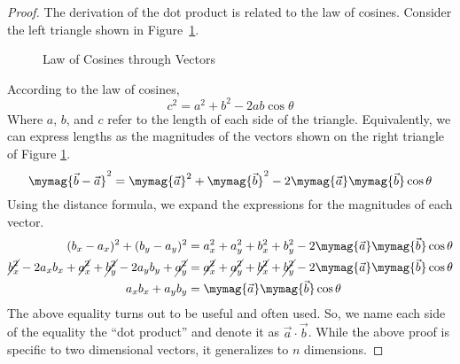 \documentclass[11pt]{article}
\newtheorem{proof}{Proof}
\begin{document}
\begin{proof}
    The derivation of the dot product is related to the law of cosines. Consider the left triangle shown in Figure~\ref{two_triangles}.
\begin{figure}
\centering
\begin{subfigure}
    \centering
\end{subfigure}
\begin{subfigure}
    \centering
\end{subfigure}
\caption{Law of Cosines through Vectors}
\label{two_triangles}
\end{figure}
According to the law of cosines,
\begin{equation*}
    c^2=a^2+b^2-2ab\cos{\theta}
\end{equation*}
Where $a$, $b$, and $c$ refer to the length of each side of the triangle. Equivalently, we can express lengths as the magnitudes of the vectors shown on the right triangle of Figure \ref{two_triangles}.
\begin{equation*}
    \mymag{\vec{b}-\vec{a}}^2=\mymag{\vec{a}}^2+\mymag{\vec{b}}^2-2\mymag{\vec{a}}\mymag{\vec{b}}\cos{\theta}
\end{equation*}
Using the distance formula, we expand the expressions for the magnitudes of each vector.
\begin{align*}
    (b_x-a_x)^2 + (b_y-a_y)^2 &= a_x^2 + a_y^2 + b_x^2 + b_y^2 - 2\mymag{\vec a}\mymag{\vec b}\cos{\theta}\\
    \cancel{b_x^2}-2a_xb_x+\cancel{a_x^2}+\cancel{b_y^2}-2a_yb_y+\cancel{a_y^2}	&= \cancel{a_x^2} + \cancel{a_y^2} + \cancel{b_x^2} + \cancel{b_y^2} - 2\mymag{\vec a}\mymag{\vec b}\cos{\theta}\\
    a_xb_x+a_yb_y &= \mymag{\vec a}\mymag{\vec b}\cos{\theta}
\end{align*}
The above equality turns out to be useful and often used. So, we name each side of the equality the ``dot product'' and denote it as $\vec{a} \cdot \vec{b}$. While the above proof is specific to two dimensional vectors, it generalizes to $n$ dimensions.
\end{proof}
\end{document}

